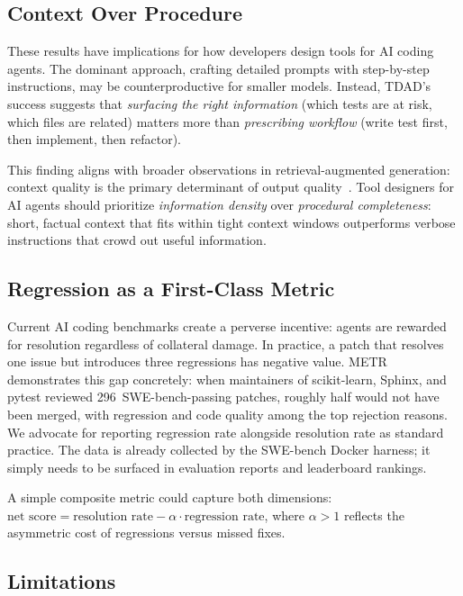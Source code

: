 \documentclass[sigconf,nonacm]{acmart}
\begin{document}
\subsection{Context Over Procedure}

These results have implications for how developers design tools for AI coding
agents.  The dominant approach, crafting detailed prompts with step-by-step
instructions, may be counterproductive for smaller models.  Instead,
\textsc{TDAD}'s success suggests that \emph{surfacing the right information}
(which tests are at risk, which files are related) matters more than
\emph{prescribing workflow} (write test first, then implement, then refactor).

This finding aligns with broader observations in
retrieval-augmented generation: context quality is the primary
determinant of output quality~\cite{edge2024graphrag}.  Tool designers
for AI agents should prioritize \emph{information density} over
\emph{procedural completeness}: short, factual context that fits within
tight context windows outperforms verbose instructions that crowd out
useful information.

\subsection{Regression as a First-Class Metric}

Current AI coding benchmarks create a perverse incentive: agents are rewarded
for resolution regardless of collateral damage.  In practice, a patch that
resolves one issue but introduces three regressions has negative value.
METR~\cite{metr2026swebench} demonstrates this gap concretely: when
maintainers of scikit-learn, Sphinx, and pytest reviewed 296~SWE-bench-passing
patches, roughly half would not have been merged, with regression and
code quality among the top rejection reasons.  We advocate for reporting
regression rate alongside resolution rate as standard practice.  The data is
already collected by the SWE-bench Docker harness; it simply needs to be
surfaced in evaluation reports and leaderboard rankings.

A simple composite metric could capture both dimensions:
$\text{net score} = \text{resolution rate} - \alpha \cdot
\text{regression rate}$, where $\alpha > 1$ reflects the asymmetric
cost of regressions versus missed fixes.

\subsection{Limitations}
\end{document}
